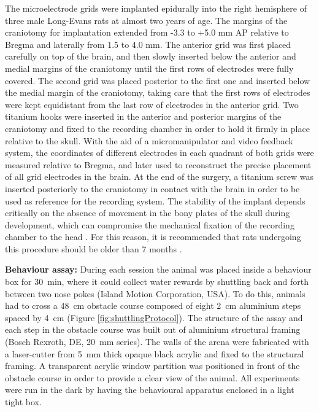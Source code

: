 The microelectrode grids were implanted epidurally into the right hemisphere of three male Long-Evans rats at almost two years of age. The margins of the craniotomy for implantation extended from -3.3 to +5.0 \si{\milli\meter} AP relative to Bregma and laterally from 1.5 to 4.0 \si{\milli\meter}. The anterior grid was first placed carefully on top of the brain, and then slowly inserted below the anterior and medial margins of the craniotomy until the first rows of electrodes were fully covered. The second grid was placed posterior to the first one and inserted below the medial margin of the craniotomy, taking care that the first rows of electrodes were kept equidistant from the last row of electrodes in the anterior grid. Two titanium hooks were inserted in the anterior and posterior margins of the craniotomy and fixed to the recording chamber in order to hold it firmly in place relative to the skull. With the aid of a micromanipulator and video feedback system, the coordinates of different electrodes in each quadrant of both grids were measured relative to Bregma, and later used to reconstruct the precise placement of all grid electrodes in the brain. At the end of the surgery, a titanium screw was inserted posteriorly to the craniotomy in contact with the brain in order to be used as reference for the recording system. The stability of the implant depends critically on the absence of movement in the bony plates of the skull during development, which can compromise the mechanical fixation of the recording chamber to the head \cite{Dimitriadis2014}. For this reason, it is recommended that rats undergoing this procedure should be older than 7 months \cite{Dimitriadis2014}.

\textbf{Behaviour assay:} During each session the animal was placed inside a behaviour box for \SI{30}{\minute}, where it could collect water rewards by shuttling back and forth between two nose pokes (Island Motion Corporation, USA). To do this, animals had to cross a \SI{48}{\centi\meter} obstacle course composed of eight \SI{2}{\centi\meter} aluminium steps spaced by \SI{4}{\centi\meter} (Figure \ref{fig:shuttlingProtocol}). The structure of the assay and each step in the obstacle course was built out of aluminium structural framing (Bosch Rexroth, DE, \SI{20}{\milli\meter} series). The walls of the arena were fabricated with a laser-cutter from \SI{5}{\milli\meter} thick opaque black acrylic and fixed to the structural framing. A transparent acrylic window partition was positioned in front of the obstacle course in order to provide a clear view of the animal. All experiments were run in the dark by having the behavioural apparatus enclosed in a light tight box.

